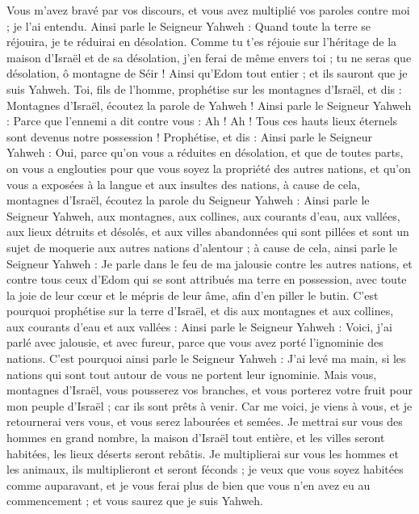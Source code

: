 \begin{multicols}{2}
Vous m'avez bravé par vos discours, et vous avez multiplié vos paroles contre moi ; je l'ai entendu.
Ainsi parle le Seigneur Yahweh : Quand toute la terre se réjouira, je te réduirai en désolation.
Comme tu t'es réjouie sur l'héritage de la maison d'Israël et de sa désolation,  j'en ferai de même envers toi ; tu ne seras que désolation, ô montagne de Séir ! Ainsi qu’Edom tout entier ; et ils sauront que je suis Yahweh\FTNT{}.
\VerseOne{}Toi, fils de l’homme, prophétise sur les montagnes d'Israël, et dis : Montagnes d'Israël, écoutez la parole de Yahweh !
Ainsi parle le Seigneur Yahweh : Parce que l'ennemi a dit contre vous : Ah ! Ah ! Tous ces hauts lieux éternels sont devenus notre possession !
Prophétise, et dis : Ainsi parle le Seigneur Yahweh : Oui, parce qu'on vous a réduites en désolation, et que de toutes parts, on vous a englouties pour que vous soyez la propriété des autres nations, et qu'on vous a exposées à la langue et aux insultes des nations,
à cause de cela, montagnes d'Israël, écoutez la parole du Seigneur Yahweh : Ainsi parle le Seigneur Yahweh, aux montagnes, aux collines, aux courants d'eau, aux vallées, aux lieux détruits et désolés, et aux villes abandonnées qui sont pillées et sont un sujet de moquerie aux autres nations d’alentour ;
à cause de cela, ainsi parle le Seigneur Yahweh : Je parle dans le feu de ma jalousie contre les autres nations, et contre tous ceux d'Edom qui se sont attribués ma terre en possession, avec toute la joie de leur cœur et le mépris de leur âme, afin d’en piller le butin\FTNT{}.
C'est pourquoi prophétise sur la terre d'Israël, et dis aux montagnes et aux collines, aux courants d'eau et aux vallées : Ainsi parle le Seigneur Yahweh : Voici, j'ai parlé avec jalousie, et avec fureur, parce que vous avez porté l'ignominie des nations.
C'est pourquoi ainsi parle le Seigneur Yahweh : J'ai levé ma main, si les nations qui sont tout autour de vous ne portent leur ignominie.
Mais vous, montagnes d'Israël, vous pousserez vos branches, et vous porterez votre fruit pour mon peuple d'Israël ; car ils sont prêts à venir.
Car me voici, je viens à vous, et je retournerai vers vous, et vous serez labourées et semées.
Je mettrai sur vous des hommes en grand nombre, la maison d'Israël tout entière, et les villes seront habitées, les lieux déserts seront rebâtis.
Je multiplierai sur vous les hommes et les animaux, ils multiplieront et seront féconds ; je veux que vous soyez habitées comme auparavant, et je vous ferai plus de bien que vous n'en avez eu au commencement ; et vous saurez que je suis Yahweh.

\end{multicols}
